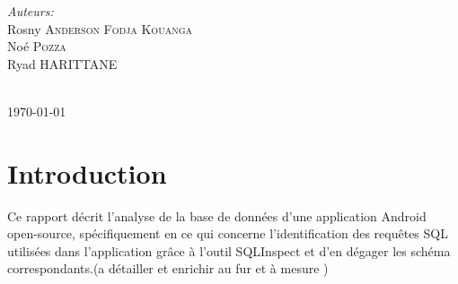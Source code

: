 \documentclass[a4paper,11pt]{article}
\begin{document}
\begin{titlepage}

    \begin{minipage}{0.6\textwidth}
        \begin{flushleft} \large
            \emph{Auteurs:}\\
            Rosny  \textsc{Anderson Fodja Kouanga}\\
            Noé  \textsc{Pozza}\\
            Ryad  \textsc{HARITTANE}\\
            
        \end{flushleft}
       
        \begin{flushleft} \large
        \end{flushleft}

    \end{minipage}\\[2cm]



    {\large \today}\\[2cm] %

    \vfill %

\end{titlepage}

\newpage
\tableofcontents
\vfill
\newpage
\section{Introduction}
Ce rapport décrit l'analyse de la base de données d'une application Android open-source, spécifiquement en ce qui concerne l'identification des requêtes SQL utilisées dans l'application grâce à l'outil SQLInspect et d'en dégager les schéma correspondants.(a détailler et enrichir au fur et à mesure )
\end{document}
